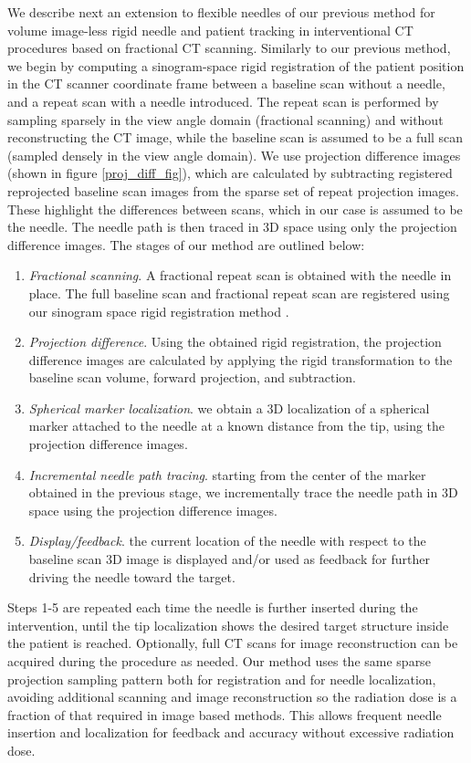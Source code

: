 \documentclass[letterpaper, 11 pt, conference]{ieeeconf}  %
\begin{document}
We describe next an extension to flexible needles of our previous method \cite{medan2017reduced} for volume image-less rigid needle and patient tracking in interventional CT procedures based on fractional CT scanning. Similarly to our previous method, we begin by computing a sinogram-space rigid registration of the patient position in the CT scanner coordinate frame between a baseline scan without a needle, and a repeat scan with a needle introduced. The repeat scan is performed by sampling sparsely in the view angle domain (fractional scanning) and without reconstructing the CT image, while the baseline scan is assumed to be a full scan (sampled densely in the view angle domain). We use projection difference images (shown in figure \ref{proj_diff_fig}), which are calculated by subtracting registered reprojected baseline scan images from the sparse set of repeat projection images. These highlight the differences between scans, which in our case is assumed to be the needle. The needle path is then traced in 3D space using only the projection difference images. The stages of our method are outlined below:
\begin{enumerate}
\item \textit{Fractional scanning}. A fractional repeat scan is obtained with the needle in place. The full baseline scan and fractional repeat scan are registered using our sinogram space rigid registration method \cite{medan2017sparse}.
\item \textit{Projection difference}. Using the obtained rigid registration, the projection difference images are calculated by applying the rigid transformation to the baseline scan volume, forward projection, and subtraction.
\item \textit{Spherical marker localization}. we obtain a 3D localization of a spherical marker attached to the needle at a known distance from the tip, using the projection difference images.
\item \textit{Incremental needle path tracing}. starting from the center of the marker obtained in the previous stage, we incrementally trace the needle path in 3D space using the projection difference images.
\item \textit{Display/feedback}. the current location of the needle with respect to the baseline scan 3D image is displayed and/or used as feedback for further driving the needle toward the target.
\end{enumerate}
Steps 1-5 are repeated each time the needle is further inserted during the intervention, until the tip localization shows the desired target structure inside the patient is reached. Optionally, full CT scans for image reconstruction can be acquired during the procedure as needed. Our method uses the same sparse projection sampling pattern both for registration and for needle localization, avoiding additional scanning and image reconstruction so the radiation dose is a fraction of that required in image based methods. This allows frequent needle insertion and localization for feedback and accuracy without excessive radiation dose.
\end{document}
